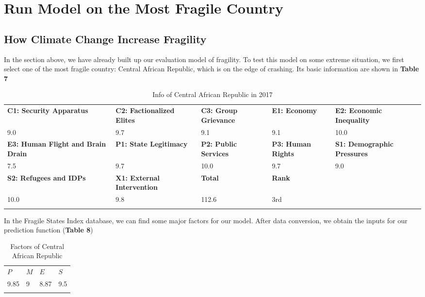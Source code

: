 \documentclass{mcmthesis}
\newlength\savedwidth
\newcommand\whline{\noalign{\global\savedwidth\arrayrulewidth
		\global\arrayrulewidth 1.2pt}%
	\hline
	\noalign{\global\arrayrulewidth\savedwidth}}
\newlength\savewidth
\newcommand\shline{\noalign{\global\savewidth\arrayrulewidth
		\global\arrayrulewidth 1.2pt}%
	\hline
	\noalign{\global\arrayrulewidth\savewidth}}
\begin{document}
	\section{Run Model on the Most Fragile Country}
	\subsection{How Climate Change Increase Fragility}
	In the section above, we have already built up our evaluation model of fragility. To test this model on some extreme situation, we first select one of the most fragile country: Central African Republic, which is on the edge of crashing. Its basic information are shown in \textbf{Table 7}

	\begin{table}[htbp]
		\renewcommand\arraystretch{1.5}
		\footnotesize
		\centering
		\begin{tabular}{m{2.5cm}<{\centering}|m{2.5cm}<{\centering}|m{2.5cm}<{\centering}|m{2.5cm}<{\centering}|m{2.5cm}<{\centering}}
			\whline
			\textbf{C1: Security Apparatus}&\textbf{C2: Factionalized Elites}&\textbf{C3: Group Grievance}&\textbf{E1: Economy}&\textbf{E2: Economic Inequality} \\
			\whline
			9.0 & 9.7 & 9.1 & 9.1 & 10.0\\
			\whline
			\textbf{E3: Human Flight and Brain Drain}&\textbf{P1: State Legitimacy}&\textbf{P2: Public Services}&\textbf{P3: Human Rights}&\textbf{S1: Demographic Pressures} \\
			\whline
			7.5 & 9.7 & 10.0 & 9.7 & 9.0\\
			\whline
			\textbf{S2: Refugees and IDPs}&\textbf{X1: External Intervention}&\textbf{Total}& \textbf{Rank} & \\
			\whline
			10.0 & 9.8 & 112.6 & 3rd &\\
			\shline
		\end{tabular}
		\caption{Info of Central African Republic in 2017}\label{tab:Info of Central African Republic in 2017}
	\end{table}
	
	
	In the Fragile States Index database, we can find some major factors for our model. After data conversion, we obtain the inputs for our prediction function (\textbf{Table 8})
	
	\begin{table}[htbp]
		\renewcommand\arraystretch{1.5}
		\footnotesize
		\centering
		\begin{tabular}{m{2.5cm}<{\centering}|m{2.5cm}<{\centering}|m{2.5cm}<{\centering}|m{2.5cm}<{\centering}}
			\whline
			\textbf{$P$}&\textbf{$M$}&\textbf{$E$}&\textbf{$S$}\\
			\whline
			9.85 & 9 & 8.87 & 9.5 \\
			\shline
		\end{tabular}
		\caption{Factors of Central African Republic}\label{tab:Factors of Central African Republic}
	\end{table}
	
\end{document}
